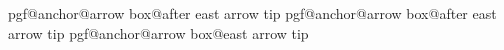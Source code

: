 {{						\else%
							\def\firstpoint{before south arrow}%
							\def\secondpoint{south east}%
						\fi%
					\fi%
				\else%
						{\csname pgf@anchor@arrow box@after east arrow tip\endcsname}%
					\ifdim\externalangle pt<\pgfmathresult pt\relax%
						\pgfmathanglebetweenpoints{\referencepoint}%
							{\csname pgf@anchor@arrow box@after east arrow\endcsname}%
						\ifdim\externalangle pt<\pgfmathresult pt\relax%
							\def\firstpoint{south east}%
							\def\secondpoint{after east arrow}%
						\else%
							\def\firstpoint{after east arrow}%
							\def\secondpoint{after east arrow head}%
						\fi%
					\else%
						\def\firstpoint{after east arrow tip}%
						\def\secondpoint{east arrow tip}%
					\fi%
				\fi%
			\fi%
		\fi%
			{\csname pgf@anchor@arrow box@\firstpoint\endcsname}%
			{\csname pgf@anchor@arrow box@\secondpoint\endcsname}%
	}
}


		
 
\endinput
